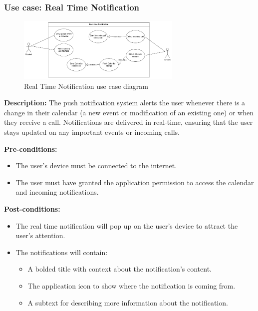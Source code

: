 \documentclass{article}
\begin{document}
\subsubsection{Use case: Real Time Notification}
    \begin{figure}[H]
        \centering
        \includegraphics[width=0.7\textwidth]{image/Real-timeNotificationUseCase.png} 
        \caption{Real Time Notification use case diagram}
        \label{fig:notification_usecase}
    \end{figure}
    \textbf{Description:} The push notification system alerts the user whenever there is a change in their calendar (a new event or modification of an existing one) or when they receive a call. Notifications are delivered in real-time, ensuring that the user stays updated on any important events or incoming calls. 
    
    \noindent \textbf{Pre-conditions:} 
        \begin{itemize}
            \item The user’s device must be connected to the internet.
            \item The user must have granted the application permission to access the calendar and incoming notifications.
        \end{itemize}
    \noindent \textbf{Post-conditions:}
    \begin{itemize}
        \item The real time notification will pop up on the user's device to attract the user's attention.
        \item The notifications will contain:
        \begin{itemize}
            \item A bolded title with context about the notification’s content.
            \item The application icon to show where the notification is coming from.
            \item A subtext for describing more information about the notification.
        \end{itemize}
    \end{itemize}
\end{document}
